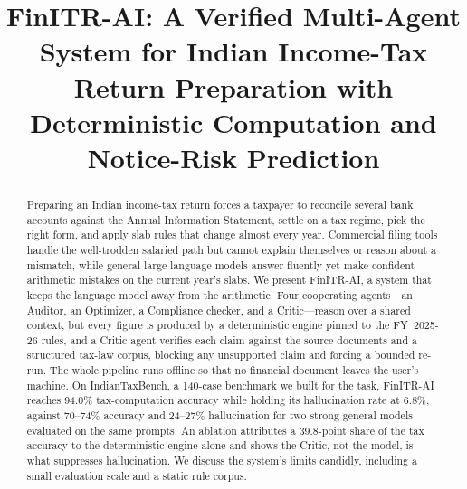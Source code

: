 \documentclass[conference]{IEEEtran}
\begin{document}
\title{FinITR-AI: A Verified Multi-Agent System for Indian Income-Tax Return
Preparation with Deterministic Computation and Notice-Risk Prediction}

\author{
\and
{}
\and
{}
}

\maketitle

\begin{abstract}
Preparing an Indian income-tax return forces a taxpayer to reconcile several bank
accounts against the Annual Information Statement, settle on a tax regime, pick
the right form, and apply slab rules that change almost every year. Commercial
filing tools handle the well-trodden salaried path but cannot explain
themselves or reason about a mismatch, while general large language models answer
fluently yet make confident arithmetic mistakes on the current year's slabs. We
present FinITR-AI, a system that keeps the language model away from the
arithmetic. Four cooperating agents---an Auditor, an Optimizer, a Compliance
checker, and a Critic---reason over a shared context, but every figure is
produced by a deterministic engine pinned to the FY~2025-26 rules, and a Critic
agent verifies each claim against the source documents and a structured tax-law
corpus, blocking any unsupported claim and forcing a bounded re-run. The whole
pipeline runs offline so that no financial document leaves the user's machine.
On IndianTaxBench, a 140-case benchmark we built for the task, FinITR-AI reaches
94.0\% tax-computation accuracy while holding its hallucination rate at 6.8\%,
against 70--74\% accuracy and 24--27\% hallucination for two strong general
models evaluated on the same prompts. An ablation attributes a 39.8-point share
of the tax accuracy to the deterministic engine alone and shows the Critic, not
the model, is what suppresses hallucination. We discuss the system's limits
candidly, including a small evaluation scale and a static rule corpus.
\end{abstract}
\end{document}
